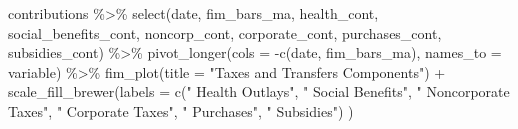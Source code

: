 \documentclass[
]{article}
\newenvironment{Shaded}{\begin{snugshade}}{\end{snugshade}}
\newcommand{\AttributeTok}[1]{\textcolor[rgb]{0.77,0.63,0.00}{#1}}
\newcommand{\FunctionTok}[1]{\textcolor[rgb]{0.00,0.00,0.00}{#1}}
\newcommand{\NormalTok}[1]{#1}
\newcommand{\SpecialCharTok}[1]{\textcolor[rgb]{0.00,0.00,0.00}{#1}}
\newcommand{\StringTok}[1]{\textcolor[rgb]{0.31,0.60,0.02}{#1}}
\begin{document}
\begin{Shaded}
\begin{Highlighting}[]
\NormalTok{  contributions }\SpecialCharTok{\%\textgreater{}\%}
  \FunctionTok{select}\NormalTok{(date, fim\_bars\_ma,}
\NormalTok{         health\_cont, social\_benefits\_cont, }
\NormalTok{         noncorp\_cont, corporate\_cont,}
\NormalTok{         purchases\_cont, subsidies\_cont) }\SpecialCharTok{\%\textgreater{}\%}
  \FunctionTok{pivot\_longer}\NormalTok{(}\AttributeTok{cols =} \SpecialCharTok{{-}}\FunctionTok{c}\NormalTok{(date, fim\_bars\_ma), }\AttributeTok{names\_to =} \StringTok{\textquotesingle{}variable\textquotesingle{}}\NormalTok{) }\SpecialCharTok{\%\textgreater{}\%}
  \FunctionTok{fim\_plot}\NormalTok{(}\AttributeTok{title =} \StringTok{"Taxes and Transfers Components"}\NormalTok{) }\SpecialCharTok{+}
  \FunctionTok{scale\_fill\_brewer}\NormalTok{(}\AttributeTok{labels =} \FunctionTok{c}\NormalTok{(}\StringTok{" Health Outlays"}\NormalTok{, }\StringTok{" Social Benefits"}\NormalTok{,}
                              \StringTok{" Noncorporate Taxes"}\NormalTok{, }\StringTok{" Corporate Taxes"}\NormalTok{, }
                              \StringTok{" Purchases"}\NormalTok{, }\StringTok{" Subsidies"}\NormalTok{)}
\NormalTok{  )}
\end{Highlighting}
\end{Shaded}
\end{document}
